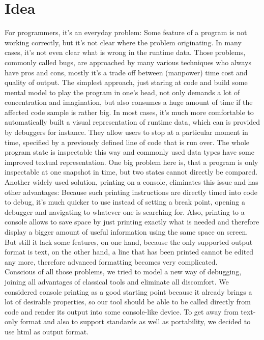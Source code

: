 \documentclass{report}
\begin{document}
\section*{Idea}
For programmers, it's an everyday problem: Some feature of a program is not working correctly, but it's not clear where the problem originating. In many cases, it's not even clear what is wrong in the runtime data. Those problems, commonly called bugs, are approached by many various techniques who always have pros and cons, mostly it's a trade off between (manpower) time cost and quality of output. The simplest approach, just staring at code and build some mental model to play the program in one's head, not only demands a lot of concentration and imagination, but also consumes a huge amount of time if the affected code sample is rather big. In most cases, it's much more comfortable to automatically built a visual representation of runtime data, which can is provided by debuggers for instance. They allow users to stop at a particular moment in time, specified by a previously defined line of code that is run over. The whole program state is inspectable this way and commonly used data types have some improved textual representation. One big problem here is, that a program is only inspectable at one snapshot in time, but two states cannot directly be compared. Another widely used solution, printing on a console, eliminates this issue and has other advantages: Because such printing instructions are directly timed into code to debug, it's much quicker to use instead of setting a break point, opening a debugger and navigating to whatever one is searching for. Also, printing to a console allows to save space by just printing exactly what is needed and therefore display a bigger amount of useful information using the same space on screen. But still it lack some features, on one hand, because the only supported output format is text, on the other hand, a line that has been printed cannot be edited any more, therefore advanced formatting becomes very complicated.\\
Conscious of all those problems, we tried to model a new way of debugging, joining all advantages of classical tools and eliminate all discomfort. We considered console printing as a good starting point because it already brings a lot of desirable properties, so our tool should be able to be called directly from code and render its output into some console-like device. To get away from text-only format and also to support standards as well as portability, we decided to use html as output format.
\end{document}
